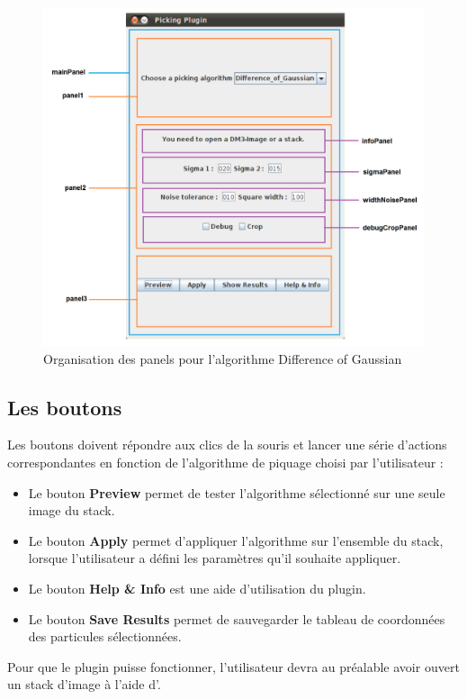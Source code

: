 \begin{figure}[!h] 
\includegraphics[width=1\textwidth]{plugin3-1.png}
\caption{Organisation des panels pour l'algorithme Difference of Gaussian}
\label{panels}
\end{figure}

\subsection{Les boutons}

Les boutons doivent répondre aux clics de la souris et lancer une série d'actions correspondantes en fonction de l'algorithme de piquage choisi par l'utilisateur :

\begin{itemize}
\item Le bouton \textbf{Preview} permet de tester l'algorithme sélectionné sur une seule image du stack.
\item Le bouton \textbf{Apply} permet d'appliquer l'algorithme sur l'ensemble du stack, lorsque l'utilisateur a défini les paramètres qu'il souhaite appliquer.
\item Le bouton \textbf{Help \& Info} est une aide d'utilisation du plugin.
\item Le bouton \textbf{Save Results} permet de sauvegarder le tableau de coordonnées des particules sélectionnées.%
\end{itemize}
Pour que le plugin puisse fonctionner, l'utilisateur devra au préalable avoir ouvert un stack d'image à l'aide d'\imj.

